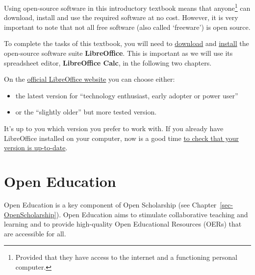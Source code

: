 \documentclass[
  letterpaper,
  DIV=11,
  numbers=noendperiod]{scrreprt}
\providecommand{\tightlist}{%
  \setlength{\itemsep}{0pt}\setlength{\parskip}{0pt}}
\begin{document}
Using open-source software in this introductory textbook means that
anyone\footnote{Provided that they have access to the internet and a
  functioning personal computer.} can download, install and use the
required software at no cost. However, it is very important to note that
not all free software (also called `freeware') is open source.

\begin{tcolorbox}[enhanced jigsaw, arc=.35mm, bottomrule=.15mm, bottomtitle=1mm, breakable, colback=white, colbacktitle=quarto-callout-important-color!10!white, colframe=quarto-callout-important-color-frame, coltitle=black, left=2mm, leftrule=.75mm, opacityback=0, opacitybacktitle=0.6, rightrule=.15mm, title=\textcolor{quarto-callout-important-color}{\faExclamation}\hspace{0.5em}{Installing LibreOffice}, titlerule=0mm, toprule=.15mm, toptitle=1mm]

To complete the tasks of this textbook, you will need to
\href{https://www.libreoffice.org/download/download-libreoffice/}{download}
and \href{https://www.libreoffice.org/get-help/install-howto/}{install}
the open-source software suite \textbf{LibreOffice}. This is important
as we will use its spreadsheet editor, \textbf{LibreOffice Calc}, in the
following two chapters.

On the
\href{https://www.libreoffice.org/download/download-libreoffice/.}{official
LibreOffice website} you can choose either:

\begin{itemize}
\tightlist
\item
  the latest version for ``technology enthusiast, early adopter or power
  user''
\item
  or the ``slightly older'' but more tested version.
\end{itemize}

It's up to you which version you prefer to work with. If you already
have LibreOffice installed on your computer, now is a good time
\href{https://help.libreoffice.org/latest/en-US/text/shared/01/online_update.html?DbPAR=SHARED}{to
check that your version is up-to-date}.

\end{tcolorbox}

\section{Open Education}\label{sec-OpenEducation}

Open Education is a key component of Open Scholarship (see
Chapter~\ref{sec-OpenScholarship}). Open Education aims to stimulate
collaborative teaching and learning and to provide high-quality Open
Educational Resources (OERs) that are accessible for all.
\end{document}
